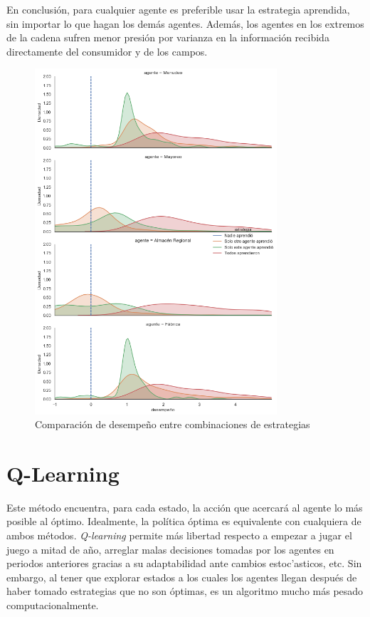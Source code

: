 En conclusi\'on, para cualquier agente es preferible usar la estrategia aprendida, sin importar lo que hagan los dem\'as agentes. Adem\'as, los agentes en los extremos de la cadena sufren menor presi\'on por varianza en la informaci\'on recibida directamente del consumidor y de los campos.\\

\begin{figure}[H]
\caption{Comparaci\'on de desempe\~no entre combinaciones de estrategias}
\label{ev_policies_dumb}
\includegraphics[width=9cm]{tesis_tex/figs/evaluating_policies_dumb_to_smart.png}
\centering
\end{figure}

\section{Q-Learning}

Este m\'etodo encuentra, para cada estado, la acci\'on que acercar\'a al agente lo m\'as posible al \'optimo. Idealmente, la pol\'itica \'optima es equivalente con cualquiera de ambos m\'etodos. \textit{Q-learning} permite m\'as libertad respecto a empezar a jugar el juego a mitad de a\~no, arreglar malas decisiones tomadas por los agentes en periodos anteriores gracias a su adaptabilidad ante cambios estoc'asticos, etc. Sin embargo, al tener que explorar estados a los cuales los agentes llegan despu\'es de haber tomado estrategias que no son \'optimas, es un algoritmo mucho m\'as pesado computacionalmente.\\

